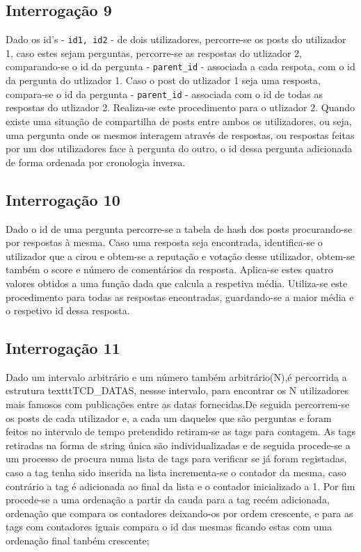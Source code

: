 \documentclass[4apaper]{report}
\begin{document}
\subsection{Interrogação 9}

Dado os id's - \texttt{id1, id2} - de dois utilizadores, percorre-se os posts do utilizador 1, caso estes sejam perguntas, percorre-se as respostas do utlizador 2, comparando-se o id da pergunta - \texttt{parent\_id} - associada a cada respota, com o id da pergunta do utlizador 1. Caso o post do utlizador 1 seja uma resposta, compara-se o id da pergunta - \texttt{parent\_id} - associada com o id de todas as respostas do utlizador 2. Realiza-se este procedimento para o utlizador 2. Quando existe uma situação de compartilha de posts entre ambos os utilizadores, ou seja, uma pergunta onde os mesmos interagem através de respostas, ou respostas feitas por um dos utilizadores face à pergunta do outro, o id dessa pergunta adicionada de forma ordenada por cronologia inversa.

\subsection{Interrogação 10}

Dado o id de uma pergunta percorre-se a tabela de hash dos posts procurando-se por respostas à mesma. Caso uma resposta seja encontrada, identifica-se o utilizador que a cirou e obtem-se a reputação e votação desse utilizador, obtem-se também o score e número de comentários da resposta.
Aplica-se estes quatro valores obtidos a uma função dada que calcula a respetiva média.
Utiliza-se este procedimento para todas as respostas encontradas, guardando-se a maior média e o respetivo id dessa resposta.

\subsection{Interrogação 11}
Dado um intervalo arbitrário e um número também arbitrário(N),é percorrida a estrutura texttt{TCD\_DATAS}, nessse intervalo, para encontrar os  N utilizadores mais famosos com publicações entre as datas fornecidas.De seguida percorrem-se os posts de cada utilizador e, a cada um daqueles que são perguntas e foram feitos no intervalo de tempo pretendido retiram-se as tags para contagem.
As tags retiradas na forma de string única são individualizadas e de seguida procede-se a um processo de procura numa lista de tags para verificar se já foram registadas, caso a tag tenha sido inserida na lista incrementa-se o contador da mesma, caso contrário a tag é adicionada ao final da lista e o contador inicializado a 1.
Por fim procede-se a uma ordenação a partir da cauda para a tag recém adicionada, ordenação que compara os contadores deixando-os por ordem crescente, e para as tags com contadores iguais compara o id das mesmas ficando estas com uma ordenação final tanbém crescente;
\end{document}
